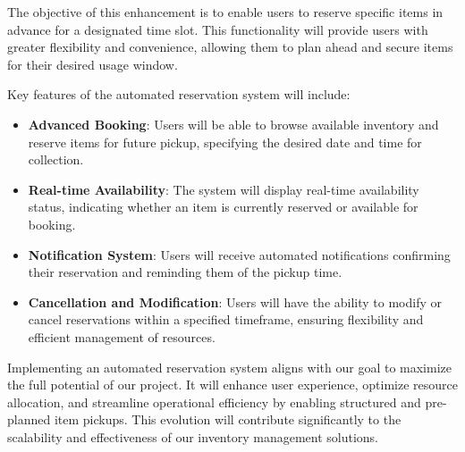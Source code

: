 The objective of this enhancement is to enable users to reserve specific items in advance for a designated time slot. This functionality will provide users with greater flexibility and convenience, allowing them to plan ahead and secure items for their desired usage window.

Key features of the automated reservation system will include:

\begin{itemize}
  \item \textbf{Advanced Booking}: Users will be able to browse available inventory and reserve items for future pickup, specifying the desired date and time for collection.
  
  \item \textbf{Real-time Availability}: The system will display real-time availability status, indicating whether an item is currently reserved or available for booking.
  
  \item \textbf{Notification System}: Users will receive automated notifications confirming their reservation and reminding them of the pickup time.
  
  \item \textbf{Cancellation and Modification}: Users will have the ability to modify or cancel reservations within a specified timeframe, ensuring flexibility and efficient management of resources.
\end{itemize}

Implementing an automated reservation system aligns with our goal to maximize the full potential of our project. It will enhance user experience, optimize resource allocation, and streamline operational efficiency by enabling structured and pre-planned item pickups. This evolution will contribute significantly to the scalability and effectiveness of our inventory management solutions.
